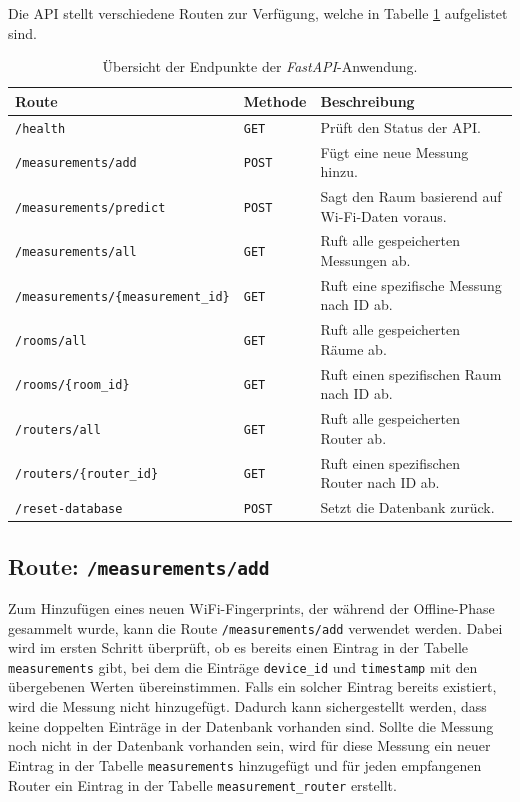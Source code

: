 Die API stellt verschiedene Routen zur Verfügung, welche in Tabelle \ref{tab:api_routes} aufgelistet sind.

\begin{table}[h]
    \centering
    \begin{tabularx}{\textwidth}{|l|l|X|}
    \hline
    \textbf{Route} & \textbf{Methode} & \textbf{Beschreibung} \\ \hline
    \texttt{/health} & \texttt{GET} & Prüft den Status der API. \\ \hline
    \texttt{/measurements/add} & \texttt{POST} & Fügt eine neue Messung hinzu. \\ \hline
    \texttt{/measurements/predict} & \texttt{POST} & Sagt den Raum basierend auf Wi-Fi-Daten voraus. \\ \hline
    \texttt{/measurements/all} & \texttt{GET} & Ruft alle gespeicherten Messungen ab. \\ \hline
    \texttt{/measurements/\{measurement\_id\}} & \texttt{GET} & Ruft eine spezifische Messung nach ID ab. \\ \hline
    \texttt{/rooms/all} & \texttt{GET} & Ruft alle gespeicherten Räume ab. \\ \hline
    \texttt{/rooms/\{room\_id\}} & \texttt{GET} & Ruft einen spezifischen Raum nach ID ab. \\ \hline
    \texttt{/routers/all} & \texttt{GET} & Ruft alle gespeicherten Router ab. \\ \hline
    \texttt{/routers/\{router\_id\}} & \texttt{GET} & Ruft einen spezifischen Router nach ID ab. \\ \hline
    \texttt{/reset-database} & \texttt{POST} & Setzt die Datenbank zurück. \\ \hline
    \end{tabularx}
    \caption{Übersicht der Endpunkte der \textit{FastAPI}-Anwendung.}
    \label{tab:api_routes}
\end{table}

\subsection*{Route: \texttt{/measurements/add}}

Zum Hinzufügen eines neuen WiFi-Fingerprints, der während der Offline-Phase gesammelt wurde, kann die Route \texttt{/measurements/add} verwendet werden. Dabei wird im ersten Schritt überprüft, ob es bereits einen Eintrag in der Tabelle \texttt{measurements} gibt, bei dem die Einträge \texttt{device\_id} und \texttt{timestamp} mit den übergebenen Werten übereinstimmen. Falls ein solcher Eintrag bereits existiert, wird die Messung nicht hinzugefügt. Dadurch kann sichergestellt werden, dass keine doppelten Einträge in der Datenbank vorhanden sind. Sollte die Messung noch nicht in der Datenbank vorhanden sein, wird für diese Messung ein neuer Eintrag in der Tabelle \texttt{measurements} hinzugefügt und für jeden empfangenen Router ein Eintrag in der Tabelle \texttt{measurement\_router} erstellt.

